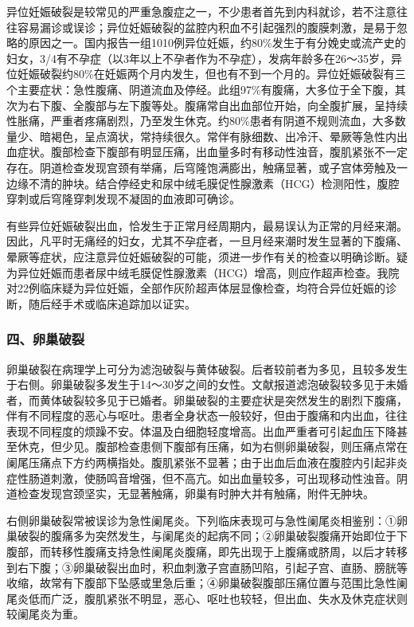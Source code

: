 异位妊娠破裂是较常见的严重急腹症之一，不少患者首先到内科就诊，若不注意往往容易漏诊或误诊；异位妊娠破裂的盆腔内积血不引起强烈的腹膜刺激，是易于忽略的原因之一。国内报告一组1010例异位妊娠，约80\%发生于有分娩史或流产史的妇女，3/4有不孕症（以3年以上不孕者作为不孕症），发病年龄多在26～35岁，异位妊娠破裂约80\%在妊娠两个月内发生，但也有不到一个月的。异位妊娠破裂有三个主要症状：急性腹痛、阴道流血及停经。此组97\%有腹痛，大多位于全下腹，其次为右下腹、全腹部与左下腹等处。腹痛常自出血部位开始，向全腹扩展，呈持续性胀痛，严重者疼痛剧烈，乃至发生休克。约80\%患者有阴道不规则流血，大多数量少、暗褐色，呈点滴状，常持续很久。常伴有脉细数、出冷汗、晕厥等急性内出血症状。腹部检查下腹部有明显压痛，出血量多时有移动性浊音，腹肌紧张不一定存在。阴道检查发现宫颈有举痛，后穹隆饱满膨出，触痛显著，或子宫体旁触及一边缘不清的肿块。结合停经史和尿中绒毛膜促性腺激素（HCG）检测阳性，腹腔穿刺或后穹隆穿刺发现不凝固的血液即可确诊。

有些异位妊娠破裂出血，恰发生于正常月经周期内，最易误认为正常的月经来潮。因此，凡平时无痛经的妇女，尤其不孕症者，一旦月经来潮时发生显著的下腹痛、晕厥等症状，应注意异位妊娠破裂的可能，须进一步作有关的检查以明确诊断。疑为异位妊娠而患者尿中绒毛膜促性腺激素（HCG）增高，则应作超声检查。我院对22例临床疑为异位妊娠，全部作灰阶超声体层显像检查，均符合异位妊娠的诊断，随后经手术或临床追踪加以证实。

\subsubsection{四、卵巢破裂}

卵巢破裂在病理学上可分为滤泡破裂与黄体破裂。后者较前者为多见，且较多发生于右侧。卵巢破裂多发生于14～30岁之间的女性。文献报道滤泡破裂较多见于未婚者，而黄体破裂较多见于已婚者。卵巢破裂的主要症状是突然发生的剧烈下腹痛，伴有不同程度的恶心与呕吐。患者全身状态一般较好，但由于腹痛和内出血，往往表现不同程度的烦躁不安。体温及白细胞轻度增高。出血严重者可引起血压下降甚至休克，但少见。腹部检查患侧下腹部有压痛，如为右侧卵巢破裂，则压痛点常在阑尾压痛点下方约两横指处。腹肌紧张不显著；由于出血后血液在腹腔内引起非炎症性肠道刺激，使肠鸣音增强，但不高亢。如出血量较多，可出现移动性浊音。阴道检查发现宫颈坚实，无显著触痛，卵巢有时肿大并有触痛，附件无肿块。

右侧卵巢破裂常被误诊为急性阑尾炎。下列临床表现可与急性阑尾炎相鉴别：①卵巢破裂的腹痛多为突然发生，与阑尾炎的起病不同；②卵巢破裂腹痛开始即位于下腹部，而转移性腹痛支持急性阑尾炎腹痛，即先出现于上腹痛或脐周，以后才转移到右下腹；③卵巢破裂出血时，积血刺激子宫直肠凹陷，引起子宫、直肠、膀胱等收缩，故常有下腹部下坠感或里急后重；④卵巢破裂腹部压痛位置与范围比急性阑尾炎低而广泛，腹肌紧张不明显，恶心、呕吐也较轻，但出血、失水及休克症状则较阑尾炎为重。

